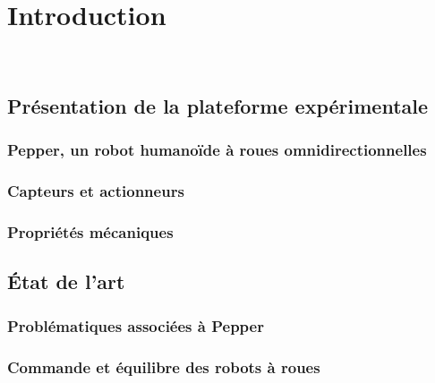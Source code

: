 \documentclass[12pt]{report}
\begin{document}
\newcommand\university{Université de Grenoble}
\newcommand\school{École doctorale EEATS}
\newcommand\structure{Laboratoire: Inria Grenoble Rhône-Alpes \\ Entreprise: Aldebaran}
\newcommand\auteur{Jory Lafaye}
\newcommand\encadrant{Dr. Pierre-Brice Wieber, Inria\\Dr. Cyrille Collette, Aldebaran\\Dr. Sebastien Dalibard, Aldebaran}
\newcommand\directeur{Dr. Bernard Brogliato, Inria\\~\\~}
\newcommand\titre{Commande des mouvements et de l'équilibre \\d'un robot humanoïde à roues omnidirectionnelles}



\tableofcontents

%
\newpage\cite{bib.miasa.2010}
%



\chapter{Introduction}~
	\section{Présentation de la plateforme expérimentale}
		\subsection{Pepper, un robot humanoïde à roues omnidirectionnelles}
		\subsection{Capteurs et actionneurs}
		\subsection{Propriétés mécaniques}	
	\section{État de l'art}
		\subsection{Problématiques associées à Pepper}
		\subsection{Commande et équilibre des robots à roues}
\end{document}
